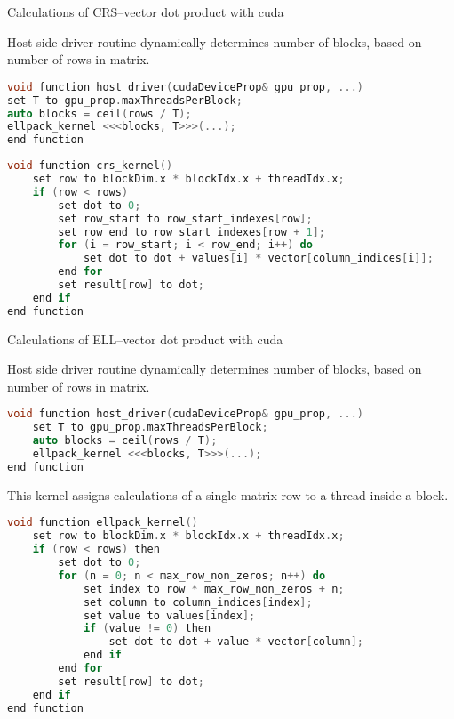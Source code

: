 	\begin{concerns}{Calculations of \gls{CRS}--vector dot product with \gls{cuda}}
		
		Host side driver routine dynamically determines number of blocks, based on number of rows in matrix. 
		
		\begin{lstlisting}[language=C++, caption={Pseudocode of host-side driver routine for \gls{ELL}--vector product.}]
void function host_driver(cudaDeviceProp& gpu_prop, ...)
set T to gpu_prop.maxThreadsPerBlock;
auto blocks = ceil(rows / T);
ellpack_kernel <<<blocks, T>>>(...);
end function
		\end{lstlisting}
		
		
\begin{lstlisting}[language=C++, caption={Pseudocode of \gls{cuda} kernel for CRS--vector dot product.}]
void function crs_kernel()
	set row to blockDim.x * blockIdx.x + threadIdx.x;
	if (row < rows)
		set dot to 0;
		set row_start to row_start_indexes[row];
		set row_end to row_start_indexes[row + 1];
		for (i = row_start; i < row_end; i++) do
			set dot to dot + values[i] * vector[column_indices[i]];
		end for
		set result[row] to dot;
	end if
end function
\end{lstlisting}
	\end{concerns}
	
	\pagebreak
	
	\begin{concerns}{Calculations of \gls{ELL}--vector dot product with \gls{cuda}}{}

		Host side driver routine dynamically determines number of blocks, based on number of rows in matrix. 
		
		\begin{lstlisting}[language=C++, caption={Pseudocode of host-side driver routine for \gls{ELL}--vector product.}]
void function host_driver(cudaDeviceProp& gpu_prop, ...)
	set T to gpu_prop.maxThreadsPerBlock;
	auto blocks = ceil(rows / T);
	ellpack_kernel <<<blocks, T>>>(...);
end function
		\end{lstlisting}
		
		This kernel assigns calculations of a single matrix row to a thread inside a block.
		
		\begin{lstlisting}[language=C++, caption={Pseudocode of \gls{cuda} kernel for \gls{ELL}--vector dot product.}]
void function ellpack_kernel()
	set row to blockDim.x * blockIdx.x + threadIdx.x;
	if (row < rows) then
		set dot to 0;
		for (n = 0; n < max_row_non_zeros; n++) do
			set index to row * max_row_non_zeros + n;
			set column to column_indices[index];
			set value to values[index];
			if (value != 0) then
				set dot to dot + value * vector[column];
			end if
		end for
		set result[row] to dot;
	end if
end function
		\end{lstlisting}
	\end{concerns}	